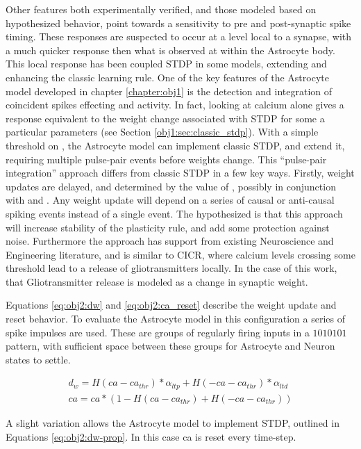 Other features both experimentally verified, and those modeled based on
hypothesized behavior, point towards a sensitivity to pre and post-synaptic
spike timing. These responses are suspected to occur at a level local to a
synapse, with a much quicker response then what is observed at within the
Astrocyte body. This local response has been coupled STDP in some models,
extending and enhancing the classic learning rule. One of the key features of
the Astrocyte model developed in chapter \ref{chapter:obj1} is the detection and
integration of coincident spikes effecting \ipt and \kp activity. In fact,
looking at calcium alone gives a response equivalent to the weight change
associated with STDP for some a particular parameters (see Section
\ref{obj1:sec:classic_stdp}). With a simple threshold on \ca, the Astrocyte
model can implement classic STDP, and extend it, requiring multiple pulse-pair
events before weights change. This ``pulse-pair integration'' approach differs
from classic STDP in a few key ways. Firstly, weight updates are delayed, and
determined by the value of \ca, possibly in conjunction with \ipt and \kp. Any
weight update will depend on a series of causal or anti-causal spiking events
instead of a single event. The hypothesized is that this approach will increase
stability of the plasticity rule, and add some protection against
noise. Furthermore the approach has support from existing Neuroscience and
Engineering literature, and is similar to CICR, where calcium levels crossing
some threshold lead to a release of gliotransmitters locally. In the case of
this work, that Gliotransmitter release is modeled as a change in synaptic weight.

Equations \ref{eq:obj2:dw} and \ref{eq:obj2:ca_reset}
describe the weight update and \ca reset behavior. To evaluate the Astrocyte
model in this configuration a series of spike impulses are used. These are
groups of regularly firing inputs in a $1010101$ pattern, with sufficient space
between these groups for Astrocyte and Neuron states to settle.

\begin{align}
  d_w = H(ca - ca_{thr}) * \alpha_{ltp} + H(-ca - ca_{thr}) *
  \alpha_{ltd} \label{eq:obj2:dw} \\
  ca = ca * (1 - H(ca - ca_{thr}) +  H(-ca - ca_{thr})) \label{eq:obj2:ca_reset}
\end{align}

A slight variation allows the Astrocyte model to implement STDP, outlined in
Equations \ref{eq:obj2:dw-prop}. In this case ca is reset every time-step.


